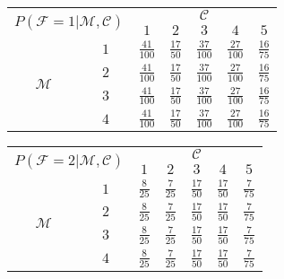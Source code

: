 \documentclass[preview]{standalone}
\newcommand{\M}{\mathcal{M}}
\newcommand{\F}{\mathcal{F}}
\newcommand{\C}{\mathcal{C}}
\begin{document}
	\begin{tabular}{|c|c|c|c|c|c|c|}
		\hline
		\multicolumn{2}{|c|}{\multirow{2}{*}{$P(\F = 1|\M,\C)$}} &                                 \multicolumn{5}{c|}{$\C$}                                  \\ \cline{3-7}
		\multicolumn{2}{|c|}{}                                   &       $1$        &       $2$       &       $3$        &       $4$        &       $5$       \\ \hline
		\multirow{4}{*}{$\M$} &               $1$                & $\frac{41}{100}$ & $\frac{17}{50}$ & $\frac{37}{100}$ & $\frac{27}{100}$ & $\frac{16}{75}$ \\ \cline{2-7}
		                      &               $2$                & $\frac{41}{100}$ & $\frac{17}{50}$ & $\frac{37}{100}$ & $\frac{27}{100}$ & $\frac{16}{75}$ \\ \cline{2-7}
		                      &               $3$                & $\frac{41}{100}$ & $\frac{17}{50}$ & $\frac{37}{100}$ & $\frac{27}{100}$ & $\frac{16}{75}$ \\ \cline{2-7}
		                      &               $4$                & $\frac{41}{100}$ & $\frac{17}{50}$ & $\frac{37}{100}$ & $\frac{27}{100}$ & $\frac{16}{75}$ \\ \hline
	\end{tabular}
	\hspace{0.5\mytextsize}
	\begin{tabular}{|c|c|c|c|c|c|c|}
		\hline
		\multicolumn{2}{|c|}{\multirow{2}{*}{$P(\F = 2|\M,\C)$}} &                              \multicolumn{5}{c|}{$\C$}                               \\ \cline{3-7}
		\multicolumn{2}{|c|}{}                                   &      $1$       &      $2$       &       $3$       &       $4$       &      $5$       \\ \hline
		\multirow{4}{*}{$\M$} &               $1$                & $\frac{8}{25}$ & $\frac{7}{25}$ & $\frac{17}{50}$ & $\frac{17}{50}$ & $\frac{7}{75}$ \\ \cline{2-7}
		                      &               $2$                & $\frac{8}{25}$ & $\frac{7}{25}$ & $\frac{17}{50}$ & $\frac{17}{50}$ & $\frac{7}{75}$ \\ \cline{2-7}
		                      &               $3$                & $\frac{8}{25}$ & $\frac{7}{25}$ & $\frac{17}{50}$ & $\frac{17}{50}$ & $\frac{7}{75}$ \\ \cline{2-7}
		                      &               $4$                & $\frac{8}{25}$ & $\frac{7}{25}$ & $\frac{17}{50}$ & $\frac{17}{50}$ & $\frac{7}{75}$ \\ \hline
	\end{tabular}
\end{document}
